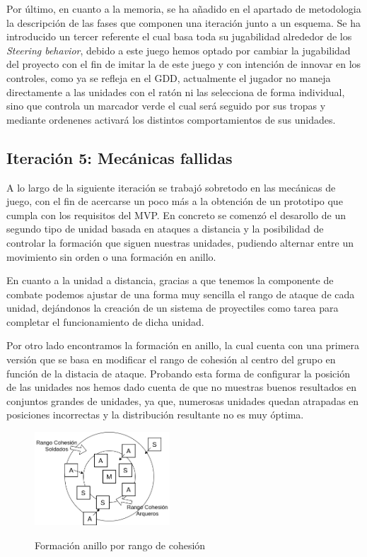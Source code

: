 Por último, en cuanto a la memoria, se ha añadido en el apartado de metodologia la
descripción de las fases que componen una iteración junto a un esquema. Se ha introducido
un tercer referente el cual basa toda su jugabilidad alrededor de los \textit{Steering
behavior}, debido a este juego hemos optado por cambiar la jugabilidad del proyecto
con el fin de imitar la de este juego y con intención de innovar en los controles, como ya se
refleja en el \ac{GDD}, actualmente el jugador no maneja directamente a las unidades con el
ratón ni las selecciona de forma individual, sino que controla un marcador verde el cual será
seguido por sus tropas y mediante ordenenes activará los distintos comportamientos de sus 
unidades. 

\subsection*{Iteración 5: Mecánicas fallidas}
A lo largo de la siguiente iteración se trabajó sobretodo en las mecánicas de juego, con el fin
de acercarse un poco más a la obtención de un prototipo que cumpla con los requisitos del \acs{MVP}.
En concreto se comenzó el desarollo de un segundo tipo de unidad basada en ataques a distancia y 
la posibilidad de controlar la formación que siguen nuestras unidades, pudiendo alternar entre un
movimiento sin orden o una formación en anillo.

En cuanto a la unidad a distancia, gracias a que tenemos la componente de combate podemos ajustar de una
forma muy sencilla el rango de ataque de cada unidad, dejándonos la creación de un sistema de proyectiles
como tarea para completar el funcionamiento de dicha unidad. 

Por otro lado encontramos la formación en anillo, la cual cuenta con una primera versión que se basa en
modificar el rango de cohesión al centro del grupo en función de la distacia de ataque. Probando esta forma 
de configurar la posición de las unidades nos hemos dado cuenta de que no muestras buenos resultados en
conjuntos grandes de unidades, ya que, numerosas unidades quedan atrapadas en posiciones incorrectas y la
distribución resultante no es muy óptima.

\begin{figure}[htb]
\centering
\includegraphics[width=0.45\textwidth]{imagenes/diario_desarrollo/anillo1.png}\\
\caption{Formación anillo por rango de cohesión}
\label{fig:anillo1}
\end{figure}

